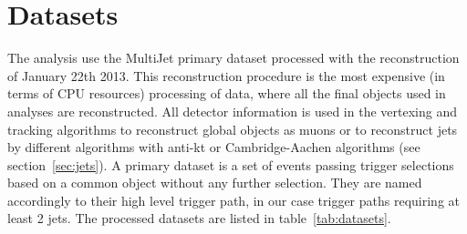 \section{Datasets}
\label{sec:data}

The analysis use the MultiJet primary dataset processed with the reconstruction of January 22th 2013. This reconstruction procedure is the most expensive (in terms of CPU resources) processing of data, where all the final objects used in analyses are reconstructed. All detector information is used in the vertexing and tracking algorithms to reconstruct global objects as muons or to reconstruct jets by different algorithms with anti-kt or Cambridge-Aachen algorithms (see section~\ref{sec:jets}). A primary dataset is a set of events passing trigger selections based on a common object without any further selection. They are named accordingly to their high level trigger path, in our case trigger paths requiring at least 2 jets. The processed datasets are listed in table~\ref{tab:datasets}.

\begin{table*}[htbH]
\begin{center}
\caption{List of Multijet Primary Dataset used in the analysis and the corresponding integrated luminosity calculated using the golden JSON (Java Script Object Notation) file. The golden JSON file contains the information about the luminosity sections considered as good for all runs. A good luminosity section is defined as a luminosity section where the detector was fully functioning, that is all subsystems were taking data without any problems.  \label{tab:datasets}}
\end{center}
\end{table*}

